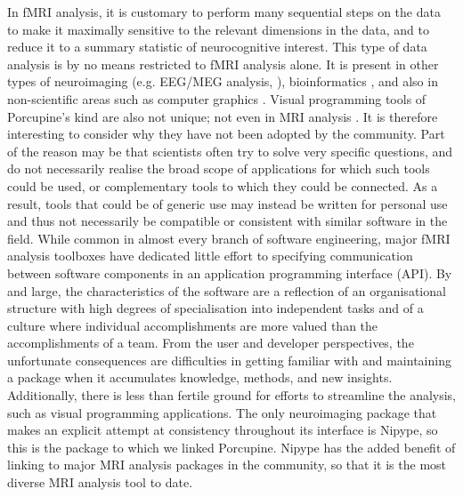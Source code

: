 In fMRI analysis, it is customary to perform many sequential steps on the data to make it maximally sensitive to the relevant dimensions in the data, and to reduce it to a summary statistic of neurocognitive interest. This type of data analysis is by no means restricted to fMRI analysis alone. It is present in other types of neuroimaging (e.g. EEG/MEG analysis, \cite{Oostenveld2011}), bioinformatics \cite{Wolstencroft2013}, and also in non-scientific areas such as computer graphics \cite{Blender}. Visual programming tools of Porcupine's kind are also not unique; not even in MRI analysis \cite{Lucas2010}. It is therefore interesting to consider why they have not been adopted by the community. Part of the reason may be that scientists often try to solve very specific questions, and do not necessarily realise the broad scope of applications for which such tools could be used, or complementary tools to which they could be connected. As a result, tools that could be of generic use may instead be written for personal use and thus not necessarily be compatible or consistent with similar software in the field. While common in almost every branch of software engineering, major fMRI analysis toolboxes have dedicated little effort to specifying communication between software components in an application programming interface (API). By and large, the characteristics of the software are a reflection of an organisational structure with high degrees of specialisation into independent tasks and of a culture where individual accomplishments are more valued than the accomplishments of a team. From the user and developer perspectives, the unfortunate consequences are difficulties in getting familiar with and maintaining a package when it accumulates knowledge, methods, and new insights. Additionally, there is less than fertile ground for efforts to streamline the analysis, such as visual programming applications. The only neuroimaging package that makes an explicit attempt at consistency throughout its interface is Nipype, so this is the package to which we linked Porcupine. Nipype has the added benefit of linking to major MRI analysis packages in the community, so that it is the most diverse MRI analysis tool to date.

